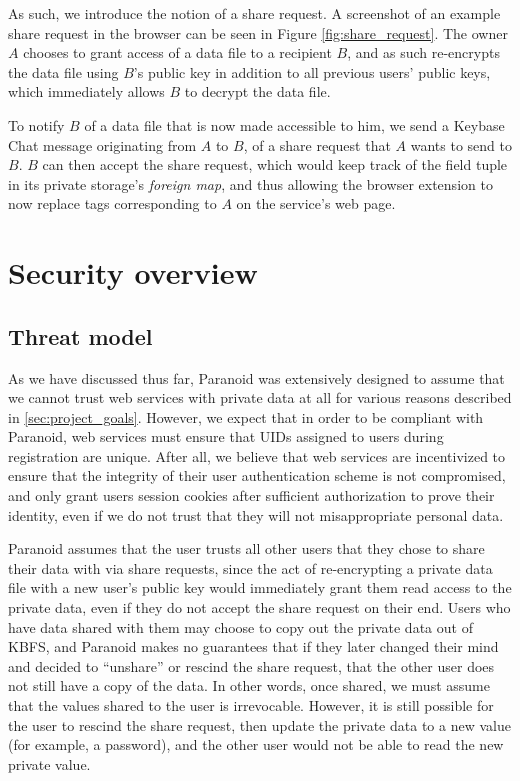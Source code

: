 \documentclass[letterpaper,twocolumn,10pt]{article}
\begin{document}
As such, we introduce the notion of a share request. A screenshot of an example share request in the browser can be seen in Figure \ref{fig:share_request}. The owner $A$ chooses to grant access of a data file to a recipient $B$, and as such re-encrypts the data file using $B$'s public key in addition to all previous users' public keys, which immediately allows $B$ to decrypt the data file.

To notify $B$ of a data file that is now made accessible to him, we send a Keybase Chat message originating from $A$ to $B$, of a share request that $A$ wants to send to $B$. $B$ can then accept the share request, which would keep track of the field tuple in its private storage's \textit{foreign map}, and thus allowing the browser extension to now replace tags corresponding to $A$ on the service's web page.

\section{Security overview}

\subsection{Threat model}

As we have discussed thus far, Paranoid was extensively designed to assume that we cannot trust web services with private data at all for various reasons described in \cref{sec:project_goals}. However, we expect that in order to be compliant with Paranoid, web services must ensure that UIDs assigned to users during registration are unique. After all, we believe that web services are incentivized to ensure that the integrity of their user authentication scheme is not compromised, and only grant users session cookies after sufficient authorization to prove their identity, even if we do not trust that they will not misappropriate personal data.

Paranoid assumes that the user trusts all other users that they chose to share their data with via share requests, since the act of re-encrypting a private data file with a new user's public key would immediately grant them read access to the private data, even if they do not accept the share request on their end. Users who have data shared with them may choose to copy out the private data out of KBFS, and Paranoid makes no guarantees that if they later changed their mind and decided to ``unshare'' or rescind the share request, that the other user does not still have a copy of the data. In other words, once shared, we must assume that the values shared to the user is irrevocable. However, it is still possible for the user to rescind the share request, then update the private data to a new value (for example, a password), and the other user would not be able to read the new private value.
\end{document}
